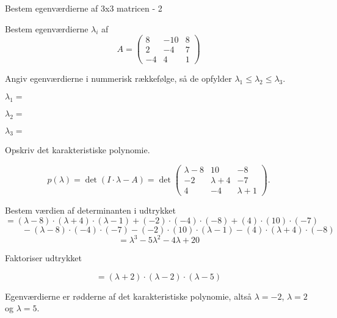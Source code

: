 \documentclass{article}
\begin{document}
\begin{exercise}{Bestem egenværdierne af 3x3 matricen - 2}

Bestem egenværdierne $\lambda_i$ af 
\[
A=\begin{pmatrix}
8 & -10 & 8 \\
2 & -4 & 7 \\
-4 & 4 & 1
\end{pmatrix}
\]

Angiv egenværdierne i nummerisk rækkefølge, så de
opfylder $\lambda_1 \le \lambda_2 \le \lambda_3$.

$\lambda_1 = $ 

$\lambda_2 = $ 

$\lambda_3 = $ 

\hint
Opskriv det karakteristiske polynomie.

\hint
\[
p(\lambda)=\det\left(I \cdot \lambda - A \right)=\det\begin{pmatrix}
\lambda - 8 & 10 & -8 \\
-2 & \lambda + 4 & -7 \\
4 & -4 & \lambda + 1 
\end{pmatrix}.
\]

\hint
Bestem værdien af determinanten i udtrykket
\[
=(\lambda -8) \cdot (\lambda +4) \cdot (\lambda -1)+(-2) \cdot (-4) \cdot (-8)+(4) \cdot (10) \cdot (-7) 
\]
	\[
\qquad -(\lambda -8) \cdot (-4) \cdot (-7)-(-2) \cdot (10) \cdot (\lambda -1)-(4) \cdot (\lambda +4) \cdot (-8)
\]
\[
= \lambda ^3-5\lambda ^2-4\lambda +20
\]

\hint
Faktoriser udtrykket

\hint
\[
=(\lambda +2) \cdot (\lambda -2) \cdot (\lambda -5)
\]

\hint
Egenværdierne er rødderne af det karakteristiske polynomie, 
altså
$\lambda=-2$, $\lambda=2$ og $\lambda=5$.

\end{exercise}
\end{document}
